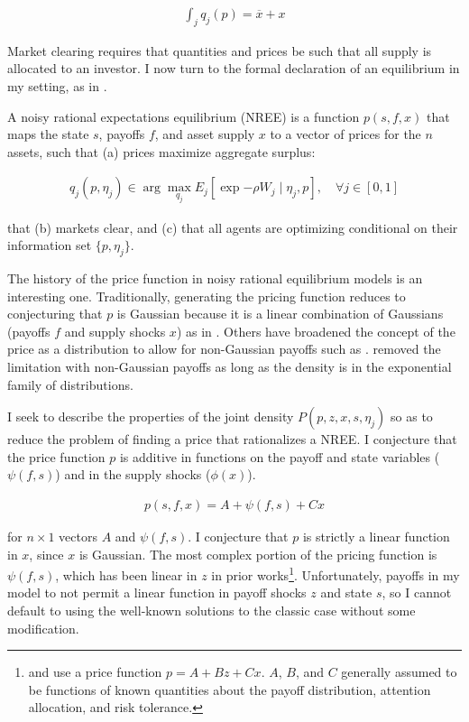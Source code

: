 \documentclass{article}
\begin{document}
\begin{align}
    \int_j{q_j(p)} = \overline x + x
\end{align}

\noindent Market clearing requires that quantities and prices be such that all supply is allocated to an investor. I now turn to the formal declaration of an equilibrium in my setting, as in \textcite{breon-drish_existence_2015}.

\begin{definition}
    A noisy rational expectations equilibrium (NREE) is a function $p(s, f, x)$ that maps the state $s$, payoffs $f$, and asset supply $x$ to a vector of prices for the $n$ assets, such that (a) prices maximize aggregate surplus:

    \begin{align}
        q_j(p, \eta_j) \in \arg\max_{q_j} E_j [\exp{-\rho W_j} \mid \eta_j, p], \quad \forall j \in [0,1]
    \end{align}

    \noindent that (b) markets clear, and (c) that all agents are optimizing conditional on their information set $\{p, \eta_j\}$.

\end{definition}

The history of the price function in noisy rational equilibrium models is an interesting one. Traditionally, generating the pricing function reduces to conjecturing that $p$ is Gaussian because it is a linear combination of Gaussians (payoffs $f$ and supply shocks $x$) as in \textcite{admati_noisy_1985}. Others have broadened the concept of the price as a distribution to allow for non-Gaussian payoffs such as \textcite{breon-drish_existence_2015}. \textcite{breon-drish_existence_2015} removed the limitation with non-Gaussian payoffs as long as the density is in the exponential family of distributions. 

I seek to describe the properties of the joint density $P(p, z, x, s, \eta_j)$ so as to reduce the problem of finding a price that rationalizes a NREE. I conjecture that the price function $p$ is additive in functions on the payoff and state variables ($\psi(f, s)$) and in the supply shocks ($\phi(x)$).

\begin{align}
    p(s,f,x) = A + \psi(f, s) + C x
\end{align}

\noindent for $n \times 1$ vectors $A$ and $\psi(f,s)$. I conjecture that $p$ is strictly a linear function in $x$, since $x$ is Gaussian. The most complex portion of the pricing function is $\psi(f, s)$, which has been linear in $z$ in prior works\footnote{\textcite{admati_noisy_1985} and \textcite{kacperczyk_rational_2016} use a price function $p = A + B z + C x$. $A$, $B$, and $C$ generally assumed to be functions of known quantities about the payoff distribution, attention allocation, and risk tolerance.}. Unfortunately, payoffs in my model to not permit a linear function in payoff shocks $z$ and state $s$, so I cannot default to using the well-known solutions to the classic case without some modification.
\end{document}
